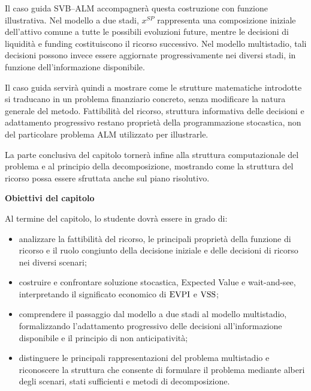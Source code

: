 Il caso guida SVB--ALM accompagner\`a questa costruzione con funzione
illustrativa. Nel modello a due stadi, $x^{SP}$ rappresenta una composizione
iniziale dell'attivo comune a tutte le possibili evoluzioni future, mentre
le decisioni di liquidit\`a e funding costituiscono il ricorso successivo.
Nel modello multistadio, tali decisioni possono invece essere aggiornate
progressivamente nei diversi stadi, in funzione dell'informazione disponibile.

Il caso guida servir\`a quindi a mostrare come le strutture matematiche
introdotte si traducano in un problema finanziario concreto, senza modificare
la natura generale del metodo. Fattibilit\`a del ricorso, struttura
informativa delle decisioni e adattamento progressivo restano propriet\`a
della programmazione stocastica, non del particolare problema ALM utilizzato
per illustrarle.

La parte conclusiva del capitolo torner\`a infine alla struttura
computazionale del problema e al principio della decomposizione, mostrando
come la struttura del ricorso possa essere sfruttata anche sul piano
risolutivo.

\medskip

\noindent
\textbf{Obiettivi del capitolo}

Al termine del capitolo, lo studente dovr\`a essere in grado di:

\begin{itemize}

\item analizzare la fattibilit\`a del ricorso, le principali propriet\`a
della funzione di ricorso e il ruolo congiunto della decisione iniziale e
delle decisioni di ricorso nei diversi scenari;

\item costruire e confrontare soluzione stocastica, Expected Value e
wait-and-see, interpretando il significato economico di $\operatorname{EVPI}$ e $\operatorname{VSS}$;

\item comprendere il passaggio dal modello a due stadi al modello multistadio,
formalizzando l'adattamento progressivo delle decisioni all'informazione
disponibile e il principio di non anticipativit\`a;

\item distinguere le principali rappresentazioni del problema multistadio e
riconoscere la struttura che consente di formulare il problema mediante alberi
degli scenari, stati sufficienti e metodi di decomposizione.

\end{itemize}

